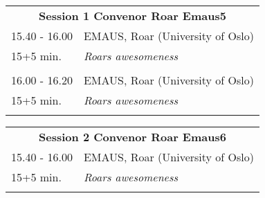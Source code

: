 \begin{table}[h!]
\begin{tabular}{p{3cm}p{13cm}}
\multicolumn{2}{c}{{\bf Session 1  \hfill Convenor Roar Emaus5}}\\ 
 15.40 - 16.00 & EMAUS, Roar (University of Oslo)\\ 
15+5 min. & {\it Roars awesomeness}\\ 
 & \\ 16.00 - 16.20 & EMAUS, Roar (University of Oslo)\\ 
15+5 min. & {\it Roars awesomeness}\\ 
 & \\ \end{tabular}
\end{table}

\hspace*{-10cm}
\begin{table}[h!]
\begin{tabular}{p{3cm}p{13cm}}
\multicolumn{2}{c}{{\bf Session 2  \hfill Convenor Roar Emaus6}}\\ 
 15.40 - 16.00 & EMAUS, Roar (University of Oslo)\\ 
15+5 min. & {\it Roars awesomeness}\\ 
 & \\ \end{tabular}
\end{table}

\hspace*{-10cm}
